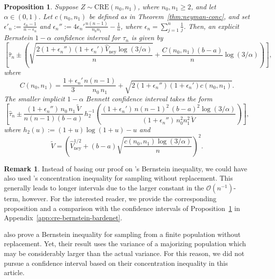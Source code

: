 \documentclass[aos]{imsart2}
\theoremstyle{plain}
\newtheorem{proposition}[theorem]{Proposition}
\theoremstyle{definition}
\newtheorem*{remark}{Remark}
\newcommand{\vhn}{\hat{V}_{\mathrm{ney}}}
\newcommand{\tauh}{\hat{\tau}}
\newcommand{\cre}{\mathrm{CRE}}
\begin{document}
\begin{proposition}\label{prop:cre-bernstein}
    Suppose $Z \sim \cre(n_0,n_1)$, where $n_0,n_1 \geq 2$, and let $\alpha \in (0,1)$. Let $c(n_0,n_1)$ be defined as in Theorem~\ref{thm:neyman-conc}, and set $\epsilon'_n := \frac{\epsilon_n-1}{n-\epsilon_n}$ and $\epsilon_n'' := 4\epsilon_n'\frac{n(n-1)}{n_0n_1}-\frac{1}{n}$, where $\epsilon_n = \sum_{j=1}^n \frac{1}{j}$. Then, an explicit Bernstein $1-\alpha$ confidence interval for $\tau_n$ is given by
    \begin{equation*}
        \left[\tauh_n \pm \left(\sqrt{\frac{2(1+\epsilon_n'')(1+\epsilon_n') \vhn \log(3/\alpha)}{n}} + \frac{C(n_0,n_1)(b-a)}{n} \log(3/\alpha)\right)\right],
    \end{equation*}
    where
    \begin{equation*}
        C(n_0,n_1)= \frac{1+\epsilon_n'}{3}\frac{n(n-1)}{n_0\,n_1} + \sqrt{2(1+\epsilon_n'')(1+\epsilon_n')c(n_0,n_1)}.
    \end{equation*}
    The smaller implicit $1-\alpha$ Bennett confidence interval takes the form
    \begin{equation*}
        \left[\tauh_n \pm \frac{(1+\epsilon_n'')\,n_0\,n_1\,\tilde{V}}{n(n-1)(b-a)}\,h_2^{-1}\left(\frac{(1+\epsilon_n')\,n(n-1)^2\,(b-a)^2 \log(3/\alpha)}{(1+\epsilon_n'')\,n_0^2n_1^2\,\tilde{V}}\right)\right],
    \end{equation*}
    where $h_2(u):=(1+u)\log(1+u)-u$ and
    \begin{equation*}
        \tilde{V} = \left(\vhn^{1/2}+(b-a)\sqrt{\frac{c(n_0,n_1)\log(3/\alpha)}{n}}\right)^2.
    \end{equation*}
\end{proposition}
\begin{remark} Instead of basing our proof on \citet{barber_hoeffding_2024}'s Bernstein inequality, we could have also used \citet{bardenet_concentration_2015}'s concentration inequality for sampling without replacement. This generally leads to longer intervals due to the larger constant in the $\mathcal{O}(n^{-1})$-term, however. For the interested reader, we provide the corresponding proposition and a comparison with the confidence intervals of Proposition~\ref{prop:cre-bernstein} in Appendix~\ref{app:cre-bernstein-bardenet}.

\citet{greene_exponential_2017} also prove a Bernstein inequality for sampling from a finite population without replacement. Yet, their result uses the variance of a majorizing population which may be considerably larger than the actual variance. For this reason, we did not pursue a confidence interval based on their concentration inequality in this article.
\end{remark}
\end{document}
